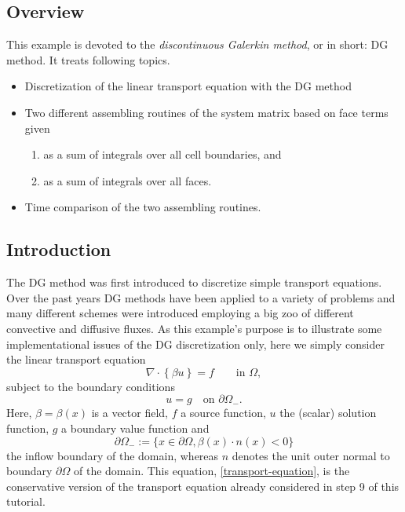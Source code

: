 \documentclass[11pt]{article}
\begin{document}
\subsection{Overview}
This example is devoted to the \emph{discontinuous Galerkin method}, or
in short: DG method. It treats following topics.
\begin{itemize}
\item Discretization of the linear transport equation with the DG method
\item Two different assembling routines of the system matrix based on face terms given
\begin{enumerate}
\item as a sum of integrals over all cell boundaries, and
\item as a sum of integrals over all faces.
\end{enumerate}
\item Time comparison of the two assembling routines.
\end{itemize}

\subsection{Introduction}
The DG method was first introduced to discretize simple transport
equations. Over the past years DG methods have been applied to a
variety of problems and many different schemes were introduced
employing a big zoo of different convective and diffusive fluxes.  As
this example's purpose is to illustrate some implementational issues
of the DG discretization only, here we simply consider the linear
transport equation
\begin{equation}\label{transport-equation}
  \nabla\cdot \left\{\beta u\right\}=f  \qquad\mbox{in }\Omega,
\end{equation}
subject to the boundary conditions
\[
u=g\quad\mbox{on }\partial\Omega_-.
\]
Here, $\beta=\beta(x)$ is a vector field, $f$ a source function, $u$ the
(scalar) solution function, $g$ a boundary value function and
\[
\partial\Omega_-:=\{x\in\partial\Omega, \beta(x)\cdot n(x)<0\}
\]
the inflow boundary of the domain, whereas $n$ denotes the unit outer
normal to boundary $\partial\Omega$ of the domain. This equation,
\eqref{transport-equation}, is the conservative version of the
transport equation already considered in step 9 of this tutorial.
\end{document}
